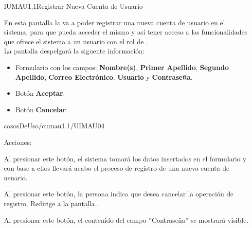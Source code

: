 \begin{IU}{IUMAU1.1}{Registrar Nueva Cuenta de Usuario}{En esta pantalla la  va a poder registrar una nueva cuenta de usuario en el sistema, para que pueda acceder el mismo y así tener acceso a las funcionalidades que ofrece el sistema a un usuario con el rol de .\\
		
La pantalla despelgará la siguente información:
\begin{itemize}
	\item Formulario con los campos: \textbf{Nombre(s)}, \textbf{Primer Apellido}, \textbf{Segundo Apellido}, \textbf{Correo Electrónico}, \textbf{Usuario} y \textbf{Contraseña}.
	\item Botón \textbf{Aceptar}.
	\item Botón \textbf{Cancelar}.
\end{itemize}



 }{casosDeUso/cumau1.1/UIMAU04}
	\item[Acciones:]\hspace{1pt}
		\begin{Citemize}
			\item {} Al presionar este botón, el sistema tomará los datos insertados en el formulario y con base a ellos llevará acabo el proceso de registro de una nueva cuenta de usuario.
			
			\item {} Al presionar este botón, la persona indica que desea cancelar la operación de registro. Redirige a la pantalla .
			
			\item \slasheyeIcon{} Al presionar este botón, el contenido del campo ''Contraseña'' se mostrará visible.
		\end{Citemize}
\end{IU}